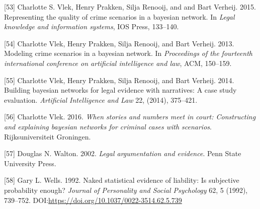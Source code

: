 \documentclass[11pt,dvipsnames,enabledeprecatedfontcommands]{scrartcl}
\begin{document}
\hypertarget{ref-vlek2015}{}
{[}53{]} Charlotte S. Vlek, Henry Prakken, Silja Renooij, and and Bart
Verheij. 2015. Representing the quality of crime scenarios in a bayesian
network. In \emph{Legal knowledge and information systems}, IOS Press,
133--140.

\hypertarget{ref-vlek2013modeling}{}
{[}54{]} Charlotte Vlek, Henry Prakken, Silja Renooij, and Bart Verheij.
2013. Modeling crime scenarios in a bayesian network. In
\emph{Proceedings of the fourteenth international conference on
artificial intelligence and law}, ACM, 150--159.

\hypertarget{ref-vlek2014building}{}
{[}55{]} Charlotte Vlek, Henry Prakken, Silja Renooij, and Bart Verheij.
2014. Building bayesian networks for legal evidence with narratives: A
case study evaluation. \emph{Artificial Intelligence and Law} 22,
(2014), 375--421.

\hypertarget{ref-vlek2016stories}{}
{[}56{]} Charlotte Vlek. 2016. \emph{When stories and numbers meet in
court: Constructing and explaining bayesian networks for criminal cases
with scenarios}. Rijksuniversiteit Groningen.

\hypertarget{ref-Walton2002}{}
{[}57{]} Douglas N. Walton. 2002. \emph{Legal argumentation and
evidence}. Penn State University Press.

\hypertarget{ref-wells1992naked}{}
{[}58{]} Gary L. Wells. 1992. Naked statistical evidence of liability:
Is subjective probability enough? \emph{Journal of Personality and
Social Psychology} 62, 5 (1992), 739--752.
DOI:\url{https://doi.org/10.1037/0022-3514.62.5.739}
\end{document}
